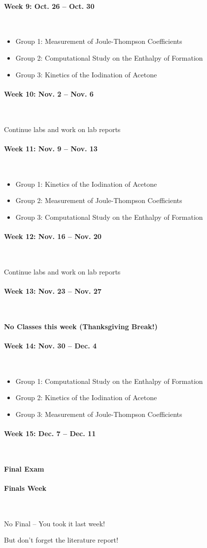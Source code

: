 \documentclass[12pt, letterpaper]{article}
\begin{document}
\paragraph{Week 9: Oct. 26 -- Oct. 30}~

\begin{itemize}
	\item Group 1: Measurement of Joule-Thompson Coefficients
	\item Group 2: Computational Study on the Enthalpy of Formation
	\item Group 3: Kinetics of the Iodination of Acetone
\end{itemize}

\paragraph{Week 10: Nov. 2 -- Nov. 6}~

Continue labs and work on lab reports

\paragraph{Week 11: Nov. 9 -- Nov. 13}~

\begin{itemize}
	\item Group 1: Kinetics of the Iodination of Acetone
	\item Group 2: Measurement of Joule-Thompson Coefficients
	\item Group 3: Computational Study on the Enthalpy of Formation
\end{itemize}

\paragraph{Week 12: Nov. 16 -- Nov. 20}~

Continue labs and work on lab reports

\paragraph{Week 13: Nov. 23 -- Nov. 27}~

\textbf{No Classes this week (Thanksgiving Break!)}

\paragraph{Week 14: Nov. 30 -- Dec. 4}~

\begin{itemize}
	\item Group 1: Computational Study on the Enthalpy of Formation
	\item Group 2: Kinetics of the Iodination of Acetone
	\item Group 3: Measurement of Joule-Thompson Coefficients
\end{itemize}


\paragraph{Week 15: Dec. 7 -- Dec. 11}~

\textbf{Final Exam}

\paragraph{Finals Week}~

No Final -- You took it last week!

But don't forget the literature report!
\end{document}
